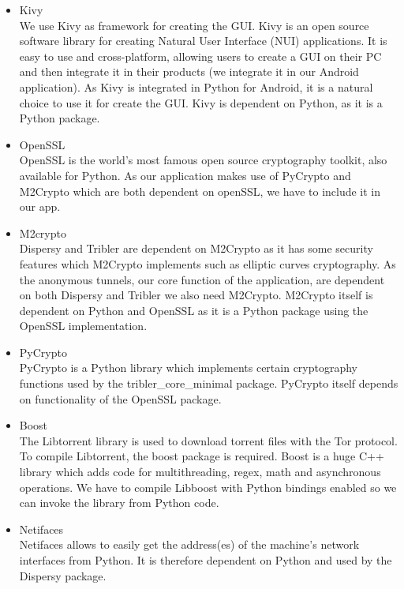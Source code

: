 		\begin{itemize}
		
			\item Kivy\\
			We use Kivy as framework for creating the GUI. Kivy is an open source software library for creating Natural User Interface (NUI) applications. It is easy to use and cross-platform, allowing users to create a GUI on their PC and then integrate it in their products (we integrate it in our Android application). As Kivy is integrated in Python for Android, it is a natural choice to use it for create the GUI. Kivy is dependent on Python, as it is a Python package. 
		
			\item OpenSSL\\
			OpenSSL is the world's most famous open source cryptography toolkit, also available for Python. As our application makes use of PyCrypto and M2Crypto which are both dependent on openSSL, we have to include it in our app.
		
			\item M2crypto\\
			Dispersy and Tribler are dependent on M2Crypto as it has some security features which M2Crypto implements such as elliptic curves cryptography. As the anonymous tunnels, our core function of the application, are dependent on both Dispersy and Tribler we also need M2Crypto. M2Crypto itself is dependent on Python and OpenSSL as it is a Python package using the OpenSSL implementation.
		
			\item PyCrypto\\
			PyCrypto is a Python library which implements certain cryptography functions used by the tribler\_core\_minimal package. PyCrypto itself depends on functionality of the OpenSSL package.
		
			\item Boost\\
			The Libtorrent library is used to download torrent files with the Tor protocol. To compile Libtorrent, the boost package is required. Boost is a huge C++ library which adds code for multithreading, regex, math and asynchronous operations. We have to compile Libboost with Python bindings enabled so we can invoke the library from Python code.
		
			\item Netifaces\\
			Netifaces allows to easily get the address(es) of the machine's network interfaces from Python. It is therefore dependent on Python and used by the Dispersy package.
		

\end{itemize}

